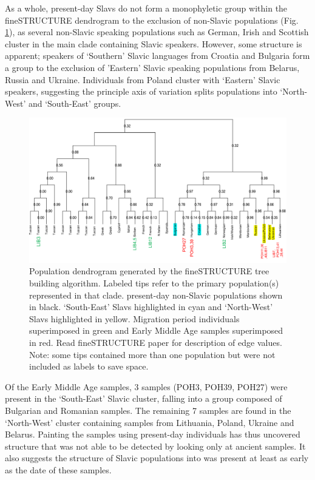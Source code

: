 As a whole, present-day Slavs do not form a monophyletic group within the fineSTRUCTURE dendrogram to the exclusion of non-Slavic populations (Fig. \ref{fig:tree_with_ancients}), as several non-Slavic speaking populations such as German, Irish and Scottish cluster in the main clade containing Slavic speakers. However, some structure is apparent; speakers of `Southern' Slavic languages from Croatia and Bulgaria form a group to the exclusion of 'Eastern' Slavic speaking populations from Belarus, Russia and Ukraine. Individuals from Poland cluster with `Eastern' Slavic speakers, suggesting the principle axis of variation splits populations into `North-West' and `South-East' groups. 

\begin{figure}[htp]
    \centering
    \includegraphics[width=1.0\textwidth]{../images/chapter5/tree_with_ancients.pdf}
    \caption{Population dendrogram generated by the fineSTRUCTURE tree building algorithm. Labeled tips refer to the primary population(s) represented in that clade. present-day non-Slavic populations shown in black. `South-East' Slavs highlighted in cyan and `North-West' Slavs highlighted in yellow. Migration period individuals superimposed in green and Early Middle Age samples superimposed in red. Read fineSTRUCTURE paper for description of edge values. Note: some tips contained more than one population but were not included as labels to save space.}
    \label{fig:tree_with_ancients}
\end{figure} 

Of the Early Middle Age samples, 3 samples (POH3, POH39, POH27) were present in the `South-East' Slavic cluster, falling into a group composed of Bulgarian and Romanian samples. The remaining 7 samples are found in the `North-West' cluster containing samples from Lithuania, Poland, Ukraine and Belarus. Painting the samples using present-day individuals has thus uncovered structure that was not able to be detected by looking only at ancient samples. It also suggests the structure of Slavic populations into was present at least as early as the date of these samples. 

